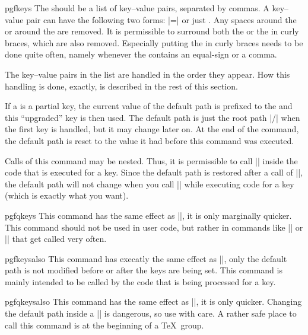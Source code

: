 \begin{docCommand}{pgfkeys}{}{}
  The  should be a list of key--value pairs, separated
  by commas. A key--value pair can have the following two forms:
  |=| or just . Any spaces around the
   or around the  are removed. It is permissible
  to surround both the  or the  in curly braces,
  which are also removed. Especially putting the  in curly
  braces needs to be done quite often, namely whenever the 
  contains an equal-sign or a comma.

  The key--value pairs in the list are handled in the order they
  appear. How this handling is done, exactly, is described in the rest
  of this section.

  If a  is a partial key, the current value of the default
  path is prefixed to the  and this ``upgraded'' key is
  then used. The default path is just the root path |/| when the first
  key is handled, but it may change later on. At the end of the
  command, the default path is reset to the value it had before this
  command was executed. 
  
  Calls of this command may be nested. Thus, it is permissible to call
  |\pgfkeys| inside the code that is executed for a key. Since the
  default path is restored after a call of |\pgfkeys|, the default
  path will not change when you call |\pgfkeys| while executing code
  for a key (which is exactly what you want).
\end{docCommand}

\begin{docCommand}{pgfqkeys}{}{}
  This command has the same effect as ||, it is only marginally
  quicker. This command should not be used in user code, but rather in
  commands like |\tikzset| or |\pgfset| that get called very often.   
\end{docCommand}

\begin{docCommand}{pgfkeysalso}{}{}
  This command has execatly the same effect as |\pgfkeys|, only the
  default path is not modified before or after the keys are being
  set. This command is mainly intended to be called by the code that
  is being processed for a key.
\end{docCommand}

\begin{docCommand}{pgfqkeysalso}{}{}{}
  This command has the same effect as ||, it is only quicker. Changing the
  default path inside a |\pgfkeyalso| is dangerous, so use with
  care. A rather safe place to call this command is at the beginning
  of a \TeX\ group.
\end{docCommand}




